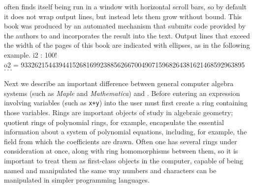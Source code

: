 \Mtwo often finds itself being run in a window with horizontal scroll bars,
so by default it does not wrap output lines, but instead lets them grow
without bound.  This book was produced by an automated mechanism that submits
code provided by the authors to \Mtwo and incorporates the result into the
text.  Output lines that exceed the width of the pages of this book are
indicated with ellipses, as in the following example.
\beginOutput
i2 : 100!\\
\emptyLine
o2 = 93326215443944152681699238856266700490715968264381621468592963895 $\cdot\cdot\cdot$\\
\endOutput

Next we describe an important difference between 
general computer algebra systems (such as {\sl Maple} and {\sl Mathematica})
and \Mtwo.  Before entering an expression involving variables (such as {\tt x+y})
into \Mtwo the user must first create a ring containing those variables.  
Rings are important
objects of study in algebraic geometry; quotient rings of polynomial rings,
for example, encapsulate the essential information about a system of
polynomial equations, including, for example, the field from which the
coefficients are drawn.  Often one has several rings under consideration at
once, along with ring homomorphisms between them, so it is important to treat
them as first-class objects in the computer, capable of being named and
manipulated the same way numbers and characters can be manipulated in simpler
programming languages.

